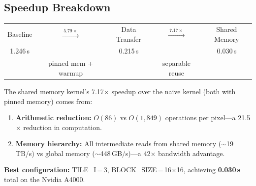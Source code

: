 \documentclass[11pt]{article}
\begin{document}
\subsection*{Speedup Breakdown}

\begin{center}
\begin{tabular}{ccccc}
Baseline & $\xrightarrow{\;5.79\times\;}$ & Data Transfer & $\xrightarrow{\;7.17\times\;}$ & Shared Memory \\
1.246\,s & & 0.215\,s & & 0.030\,s \\
& {\footnotesize pinned mem + warmup} & & {\footnotesize separable reuse} &
\end{tabular}
\end{center}

\noindent The shared memory kernel's 7.17$\times$ speedup over the naive kernel
(both with pinned memory) comes from:

\begin{enumerate}[]
  \item \textbf{Arithmetic reduction:} $O(86)$ vs $O(1{,}849)$ operations per pixel---a
        21.5$\times$ reduction in computation.
  \item \textbf{Memory hierarchy:} All intermediate reads from shared memory
        (${\sim}$19\,TB/s) vs global memory (${\sim}$448\,GB/s)---a 42$\times$
        bandwidth advantage.
\end{enumerate}

\noindent\textbf{Best configuration:} TILE\_I\,=\,3, BLOCK\_SIZE\,=\,16$\times$16,
achieving \textbf{0.030\,s} total on the Nvidia A4000.
\end{document}
